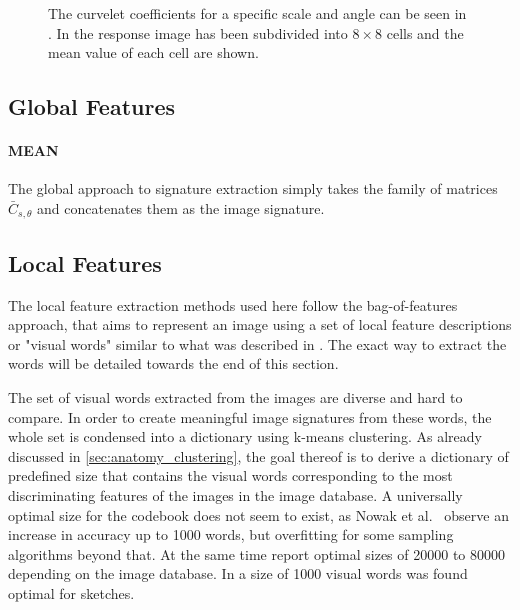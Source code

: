 \begin{figure}[h]
    \centering
    \quad
    \caption[Curvelet coefficients and means]{
        The curvelet coefficients for a specific scale and angle can be seen in
        . In
         the response image has
        been subdivided into $8 \times 8$ cells and the mean value of each cell
        are shown.
    }
    \label{fig:input_examples}
\end{figure}


\subsection{Global Features}

\paragraph{MEAN}

The global approach to signature extraction simply takes the family of matrices
$\bar{C}_{s, \theta}$ and concatenates them as the image signature.

\subsection{Local Features}

The local feature extraction methods used here follow the bag-of-features
approach, that aims to represent an image using a set of local feature
descriptions or "visual words" similar to what was described in
\autocite{sivic_video_2003}. The exact way to extract the words will be
detailed towards the end of this section.

The set of visual words extracted from the images are diverse and hard to
compare. In order to create meaningful image signatures from these words, the
whole set is condensed into a dictionary using k-means clustering. As already
discussed in \ref{sec:anatomy_clustering}, the goal thereof is to derive a
dictionary of predefined size that contains the visual words corresponding to
the most discriminating features of the images in the image database. A
universally optimal size for the codebook does not seem to exist, as Nowak et
al.\ \autocite{nowak_sampling_2006} observe an increase in accuracy up to 1000
words, but overfitting for some sampling algorithms beyond that. At the same
time \autocite{yang_evaluating_2007} report optimal sizes of 20000 to 80000
depending on the image database. In \autocite{eitz_sketch-based_2010} a size of
1000 visual words was found optimal for sketches.

